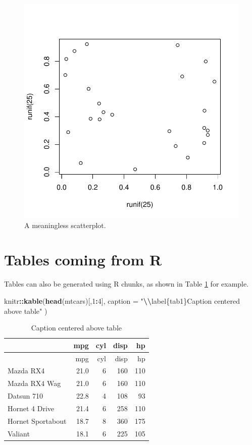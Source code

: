 \documentclass[preprint, 3p,
authoryear]{elsarticle} %
\newenvironment{Shaded}{\begin{snugshade}}{\end{snugshade}}
\newcommand{\AttributeTok}[1]{\textcolor[rgb]{0.13,0.29,0.53}{#1}}
\newcommand{\DecValTok}[1]{\textcolor[rgb]{0.00,0.00,0.81}{#1}}
\newcommand{\FunctionTok}[1]{\textcolor[rgb]{0.13,0.29,0.53}{\textbf{#1}}}
\newcommand{\NormalTok}[1]{#1}
\newcommand{\SpecialCharTok}[1]{\textcolor[rgb]{0.81,0.36,0.00}{\textbf{#1}}}
\newcommand{\StringTok}[1]{\textcolor[rgb]{0.31,0.60,0.02}{#1}}
\begin{document}
\begin{figure}

{\centering \includegraphics[width=0.5\linewidth]{Manuscript_files/figure-latex/fig2-1} 

}

\caption{\label{fig2}A meaningless scatterplot.}\label{fig:fig2}
\end{figure}

\section{Tables coming from R}\label{tables-coming-from-r}

Tables can also be generated using R chunks, as shown in Table
\ref{tab1} for example.

\begin{Shaded}
\begin{Highlighting}[]
\NormalTok{knitr}\SpecialCharTok{::}\FunctionTok{kable}\NormalTok{(}\FunctionTok{head}\NormalTok{(mtcars)[,}\DecValTok{1}\SpecialCharTok{:}\DecValTok{4}\NormalTok{], }
    \AttributeTok{caption =} \StringTok{"}\SpecialCharTok{\textbackslash{}\textbackslash{}}\StringTok{label\{tab1\}Caption centered above table"}
\NormalTok{)}
\end{Highlighting}
\end{Shaded}

\begin{longtable}[]{@{}lrrrr@{}}
\caption{\label{tab1}Caption centered above table}\tabularnewline
\toprule\noalign{}
& mpg & cyl & disp & hp \\
\midrule\noalign{}
\endfirsthead
\toprule\noalign{}
& mpg & cyl & disp & hp \\
\midrule\noalign{}
\endhead
\bottomrule\noalign{}
\endlastfoot
Mazda RX4 & 21.0 & 6 & 160 & 110 \\
Mazda RX4 Wag & 21.0 & 6 & 160 & 110 \\
Datsun 710 & 22.8 & 4 & 108 & 93 \\
Hornet 4 Drive & 21.4 & 6 & 258 & 110 \\
Hornet Sportabout & 18.7 & 8 & 360 & 175 \\
Valiant & 18.1 & 6 & 225 & 105 \\
\end{longtable}

\renewcommand\refname{References}

\end{document}
